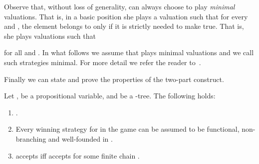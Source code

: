 \begin{remark}
	Observe that, without loss of generality, \eloise can always choose to play \emph{minimal} valuations. That is, in a basic position  she plays a valuation  such that for every  and , the element  belongs to  only if it is strictly needed to make  true. That is, she plays valuations  such that
	
	for all  and .
	In what follows we assume that \eloise plays minimal valuations and we call such strategies minimal. For more detail we refer the reader to~\cite[Proposition~2.13]{Zanasi:Thesis:2012}.
\end{remark}

\noindent
Finally we can state and prove the properties of the two-part construct.

\begin{theorem}\label{thm:fc2}
Let ,  be a propositional variable, and  be a -tree. The following holds:
\begin{enumerate}
   pt
  \item\label{point:fc2funConstrAut}
  .
\item\label{point:fc2funConstrStrategy}
  Every winning strategy for  in
  the game  can be assumed to be functional, non-branching and well-founded in .
\item\label{point:fc2funConstrEquiv}
   accepts  iff 
   accepts  for some finite chain .
\end{enumerate}
\end{theorem}
